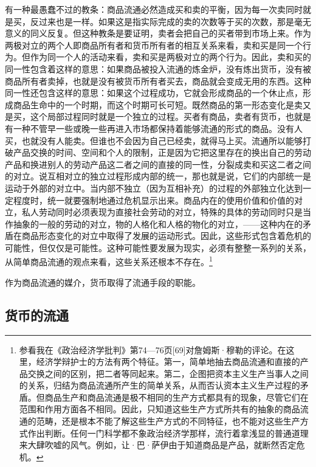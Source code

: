 \documentclass{ctexbook}
\begin{document}
        有一种最愚蠢不过的教条：商品流通必然造成买和卖的平衡，因为每一次卖同时就是买，反过来也是一样。如果这是指实际完成的卖的次数等于买的次数，那是毫无意义的同义反复。但这种教条是要证明，卖者会把自己的买者带到市场上来。作为两极对立的两个人即商品所有者和货币所有者的相互关系来看，卖和买是同一个行为。但作为同一个人的活动来看，卖和买是两极对立的两个行为。因此，卖和买的同一性包含着这样的意思：如果商品被投入流通的炼金炉，没有炼出货币，没有被商品所有者卖掉，也就是没有被货币所有者买去，商品就会变成无用的东西。这种同一性还包含这样的意思：如果这个过程成功，它就会形成商品的一个休止点，形成商品生命中的一个时期，而这个时期可长可短。既然商品的第一形态变化是卖又是买，这个局部过程同时就是一个独立的过程。买者有商品，卖者有货币，也就是有一种不管早一些或晚一些再进入市场都保持着能够流通的形式的商品。没有人买，也就没有人能卖。但谁也不会因为自己已经卖，就得马上买。流通所以能够打破产品交换的时间、空间和个人的限制，正是因为它把这里存在的换出自己的劳动产品和换进别人的劳动产品这二者之间的直接的同一性，分裂成卖和买这二者之间的对立。说互相对立的独立过程形成内部的统一，那也就是说，它们的内部统一是运动于外部的对立中。当内部不独立（因为互相补充）的过程的外部独立化达到一定程度时，统一就要强制地通过危机显示出来。商品内在的使用价值和价值的对立，私人劳动同时必须表现为直接社会劳动的对立，特殊的具体的劳动同时只是当作抽象的一般的劳动的对立，物的人格化和人格的物化的对立，——这种内在的矛盾在商品形态变化的对立中取得了发展的运动形式。因此，这些形式包含着危机的可能性，但仅仅是可能性。这种可能性要发展为现实，必须有整整一系列的关系，从简单商品流通的观点来看，这些关系还根本不存在。\footnote{参看我在《政治经济学批判》第74—76页[69]对詹姆斯·穆勒的评论。在这里，经济学辩护士的方法有两个特征。第一，简单地抽去商品流通和直接的产品交换之间的区别，把二者等同起来。第二，企图把资本主义生产当事人之间的关系，归结为商品流通所产生的简单关系，从而否认资本主义生产过程的矛盾。但商品生产和商品流通是极不相同的生产方式都具有的现象，尽管它们在范围和作用方面各不相同。因此，只知道这些生产方式所共有的抽象的商品流通的范畴，还是根本不能了解这些生产方式的不同特征，也不能对这些生产方式作出判断。任何一门科学都不象政治经济学那样，流行着拿浅显的普通道理来大肆吹嘘的风气。例如，让·巴·萨伊由于知道商品是产品，就断然否定危机。}
        
        作为商品流通的媒介，货币取得了流通手段的职能。

        \subsection{货币的流通}
\end{document}

